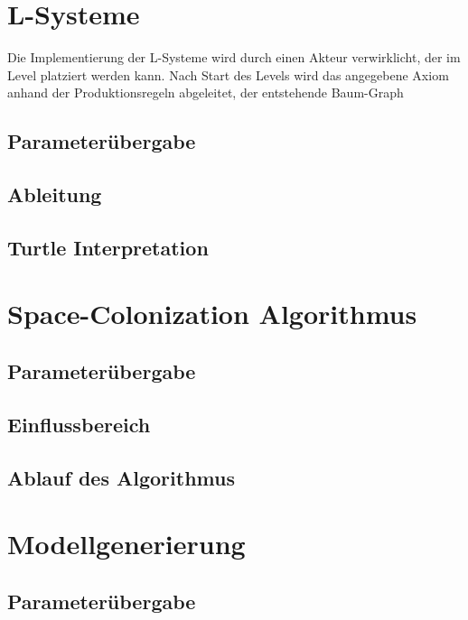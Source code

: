 \section{L-Systeme}

Die Implementierung der L-Systeme wird durch einen Akteur verwirklicht, der im Level platziert werden kann. Nach Start des Levels wird das angegebene Axiom anhand der Produktionsregeln abgeleitet, der entstehende Baum-Graph 

\subsection{Parameterübergabe}

\subsection{Ableitung}

\subsection{Turtle Interpretation} \label{subsec:TurtleInterpretationImplementation}

\section{Space-Colonization Algorithmus}

\subsection{Parameterübergabe}

\subsection{Einflussbereich}

\subsection{Ablauf des Algorithmus}


\section{Modellgenerierung}

\subsection{Parameterübergabe}

